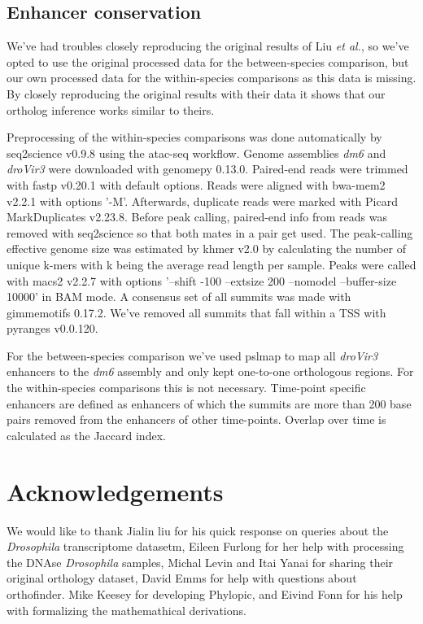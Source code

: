 \subsection{Enhancer conservation}

We've had troubles closely reproducing the original results of Liu \textit{et al.}, so we've opted to use the original processed data for the between-species comparison, but our own processed data for the within-species comparisons as this data is missing. By closely reproducing the original results with their data it shows that our ortholog inference works similar to theirs.

Preprocessing of the within-species comparisons was done automatically by seq2science v0.9.8\cite{seq2science} using the atac-seq workflow\cite{Choudhary2019}. Genome assemblies \textit{dm6} and \textit{droVir3} were downloaded with genomepy 0.13.0\cite{Frlich2023}. Paired-end reads were trimmed with fastp v0.20.1\cite{Chen2018} with default options. Reads were aligned with bwa-mem2 v2.2.1\cite{bwamem2} with options '-M'. Afterwards, duplicate reads were marked with Picard MarkDuplicates v2.23.8\cite{picard}. Before peak calling, paired-end info from reads was removed with seq2science so that both mates in a pair get used. The peak-calling effective genome size was estimated by khmer v2.0\cite{Crusoe2015} by calculating the number of unique k-mers with k being the average read length per sample. Peaks were called with macs2 v2.2.7\cite{Zhang2008} with options '--shift -100 --extsize 200 --nomodel --buffer-size 10000' in BAM mode. A consensus set of all summits was made with gimmemotifs 0.17.2\cite{gimmemotifs}. We've removed all summits that fall within a TSS with pyranges v0.0.120\cite{Stovner2019}.

For the between-species comparison we've used pslmap to map all \textit{droVir3} enhancers to the \textit{dm6} assembly and only kept one-to-one orthologous regions. For the within-species comparisons this is not necessary. Time-point specific enhancers are defined as enhancers of which the summits are more than 200 base pairs removed from the enhancers of other time-points. Overlap over time is calculated as the Jaccard index.

\section{Acknowledgements}

We would like to thank Jialin liu for his quick response on queries about the \textit{Drosophila} transcriptome datasetm, Eileen Furlong for her help with processing the DNAse \textit{Drosophila} samples, Michal Levin and Itai Yanai for sharing their original orthology dataset, David Emms for help with questions about orthofinder. Mike Keesey for developing Phylopic, and Eivind Fonn for his help with formalizing the mathemathical derivations.

